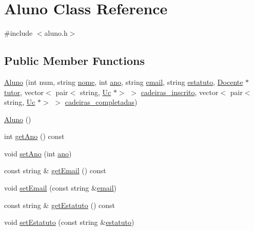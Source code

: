 \hypertarget{class_aluno}{}\section{Aluno Class Reference}
\label{class_aluno}


{\ttfamily \#include $<$aluno.\+h$>$}

\subsection*{Public Member Functions}
\begin{DoxyCompactItemize}
\item 
\hyperlink{class_aluno_ab7ed0488b4fe0366a8db56f5773d7809}{Aluno} (int num, string \hyperlink{class_aluno_a22e26cb85066e4dfdc144c502819a7b4}{nome}, int \hyperlink{class_aluno_abcf2d0bb0b690d81e01e9b38f68897c6}{ano}, string \hyperlink{class_aluno_a3f211b7d1b0aac05976bf25912b66c6b}{email}, string \hyperlink{class_aluno_ae0609c8c3939eee522aee8e7c68a2eac}{estatuto}, \hyperlink{class_docente}{Docente} $\ast$\hyperlink{class_aluno_a0569ac677617ba6b9fc420830bc21bf6}{tutor}, vector$<$ pair$<$ string, \hyperlink{class_uc}{Uc} $\ast$$>$ $>$ \hyperlink{class_aluno_a1999cc002e1c271c4722717ab457b4e4}{cadeiras\+\_\+inscrito}, vector$<$ pair$<$ string, \hyperlink{class_uc}{Uc} $\ast$$>$ $>$ \hyperlink{class_aluno_aa9de55282ab2d53a6e903999db67eefc}{cadeiras\+\_\+completadas})
\item 
\hyperlink{class_aluno_ad5106d0f7834762fbe5f71f908144336}{Aluno} ()
\item 
int \hyperlink{class_aluno_abd0b9f8a7cdd8ac51dd810424340b27b}{get\+Ano} () const
\item 
void \hyperlink{class_aluno_a05e1c531761274c17ecf85a23f75b16a}{set\+Ano} (int \hyperlink{class_aluno_abcf2d0bb0b690d81e01e9b38f68897c6}{ano})
\item 
const string \& \hyperlink{class_aluno_a11b8f11bcd88edf24950e4c865009c5c}{get\+Email} () const
\item 
void \hyperlink{class_aluno_a45246f0bd15a445e11dae4cccc231984}{set\+Email} (const string \&\hyperlink{class_aluno_a3f211b7d1b0aac05976bf25912b66c6b}{email})
\item 
const string \& \hyperlink{class_aluno_ae9bb3b0f1dd75bad1f860478631232be}{get\+Estatuto} () const
\item 
void \hyperlink{class_aluno_a4bac5fc524532359adb4a61388e6b348}{set\+Estatuto} (const string \&\hyperlink{class_aluno_ae0609c8c3939eee522aee8e7c68a2eac}{estatuto})
\item 

\end{DoxyCompactItemize}
